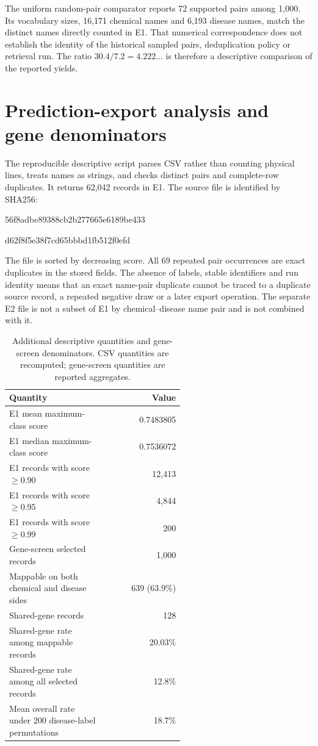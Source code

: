 The uniform random-pair comparator reports 72 supported pairs among 1,000. Its vocabulary sizes, 16,171 chemical names and 6,193 disease names, match the distinct names directly counted in E1. That numerical correspondence does not establish the identity of the historical sampled pairs, deduplication policy or retrieval run. The ratio $30.4/7.2=4.222\ldots$ is therefore a descriptive comparison of the reported yields.

\section{Prediction-export analysis and gene denominators}
The reproducible descriptive script parses CSV rather than counting physical lines, treats names as strings, and checks distinct pairs and complete-row duplicates. It returns 62,042 records in E1. The source file is identified by SHA256:
\begin{center}\small\ttfamily
56f8adbe89388cb2b277665e6189be433\par
d62f8f5e38f7cd65bbbd1fb512f0efd
\end{center}
The file is sorted by decreasing score. All 69 repeated pair occurrences are exact duplicates in the stored fields. The absence of labels, stable identifiers and run identity means that an exact name-pair duplicate cannot be traced to a duplicate source record, a repeated negative draw or a later export operation. The separate E2 file is not a subset of E1 by chemical--disease name pair and is not combined with it.

\begin{table}[htbp]
\centering\small
\caption{Additional descriptive quantities and gene-screen denominators. CSV quantities are recomputed; gene-screen quantities are reported aggregates.}
\label{tab:additional}
\begin{tabular}{p{0.57\linewidth}r}
\toprule
Quantity & Value \\
\midrule
E1 mean maximum-class score & 0.7483805 \\
E1 median maximum-class score & 0.7536072 \\
E1 records with score $\ge 0.90$ & 12,413 \\
E1 records with score $\ge 0.95$ & 4,844 \\
E1 records with score $\ge 0.99$ & 200 \\
Gene-screen selected records & 1,000 \\
Mappable on both chemical and disease sides & 639 (63.9\%) \\
Shared-gene records & 128 \\
Shared-gene rate among mappable records & 20.03\% \\
Shared-gene rate among all selected records & 12.8\% \\
Mean overall rate under 200 disease-label permutations & 18.7\% \\
\bottomrule
\end{tabular}
\end{table}

